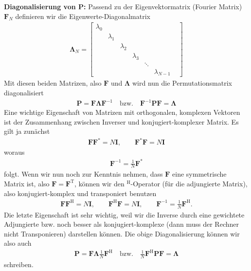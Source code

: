 \textbf{Diagonalisierung von $\bm{P}$:}
Passend zu der Eigenvektormatrix (Fourier Matrix)
$\bm{F}_N$ definieren wir die Eigenwerte-Diagonalmatrix
\begin{align}
\bm{\Lambda}_N =
\begin{bmatrix}
\lambda_0 & & & & &\\
&\lambda_1 & & & & \\
&&\lambda_2 & & & \\
&&&\lambda_3 & & \\
&&&& \ddots& & \\
&&&&&\lambda_{N-1}
\end{bmatrix}
\end{align}
Mit diesen beiden Matrizen, also $\bm{F}$ und $\bm{\Lambda}$ wird nun die
Permutationsmatrix diagonalisiert
\begin{align}
\bm{P}  = \bm{F} \bm{\Lambda} \bm{F}^{-1} \quad\text{bzw.}\quad
\bm{F}^{-1} \bm{P} \bm{F} = \bm{\Lambda}
\end{align}
Eine wichtige Eigenschaft von Matrizen mit orthogonalen, komplexen Vektoren
ist der Zusammenhang zwischen Inverser und konjugiert-komplexer Matrix.
Es gilt ja zunächst
\begin{align}
\bm{F}\bm{F}^* = N \bm{I}, \qquad \bm{F}^*\bm{F} = N \bm{I}
\end{align}
woraus
\begin{align}
\bm{F}^{-1} = \frac{1}{N} \bm{F}^*
\end{align}
folgt.
Wenn wir nun noch zur Kenntnis nehmen, dass $\bm{F}$ eine symmetrische Matrix ist,
also $\bm{F}=\bm{F}^\mathrm{T}$, können wir den $^\mathrm{H}$-Operator (für die adjungierte
Matrix), also konjugiert-komplex und transponiert benutzen
\begin{align}
\bm{F}\bm{F}^\mathrm{H} = N \bm{I},\qquad
\bm{F}^\mathrm{H}\bm{F} = N \bm{I},\qquad
\bm{F}^{-1} = \frac{1}{N} \bm{F}^\mathrm{H}.
\end{align}
Die letzte Eigenschaft ist sehr wichtig, weil wir die Inverse durch eine
gewichtete Adjungierte bzw. noch besser als konjugiert-komplexe (dann muss der Rechner
nicht Transponieren) darstellen können.
%
Die obige Diagonalisierung können wir also auch
\begin{align}
\bm{P}  = \bm{F} \bm{\Lambda} \frac{1}{N} \bm{F}^\mathrm{H} \quad\text{bzw.}\quad
\frac{1}{N} \bm{F}^\mathrm{H} \bm{P} \bm{F} = \bm{\Lambda}
\end{align}
schreiben.

